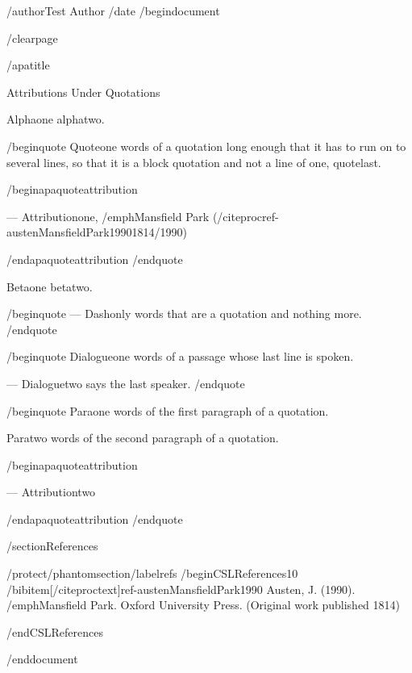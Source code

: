 /author{Test Author}
/date{}
/begin{document}


/clearpage

/apatitle{

Attributions Under Quotations

}

Alphaone alphatwo.

/begin{quote}
Quoteone words of a quotation long enough that it has to run on to
several lines, so that it is a block quotation and not a line of one,
quotelast.

/begin{apaquoteattribution}

--- Attributionone, /emph{Mansfield Park}
(/citeproc{ref-austenMansfieldPark1990}{1814/1990})

/end{apaquoteattribution}
/end{quote}

Betaone betatwo.

/begin{quote}
--- Dashonly words that are a quotation and nothing more.
/end{quote}

/begin{quote}
Dialogueone words of a passage whose last line is spoken.

--- Dialoguetwo says the last speaker.
/end{quote}

/begin{quote}
Paraone words of the first paragraph of a quotation.

Paratwo words of the second paragraph of a quotation.

/begin{apaquoteattribution}

--- Attributiontwo

/end{apaquoteattribution}
/end{quote}

/section{References}

/protect/phantomsection/label{refs}
/begin{CSLReferences}{1}{0}
/bibitem[/citeproctext]{ref-austenMansfieldPark1990}
Austen, J. (1990). /emph{Mansfield {P}ark}. Oxford University Press.
(Original work published 1814)

/end{CSLReferences}




/end{document}
